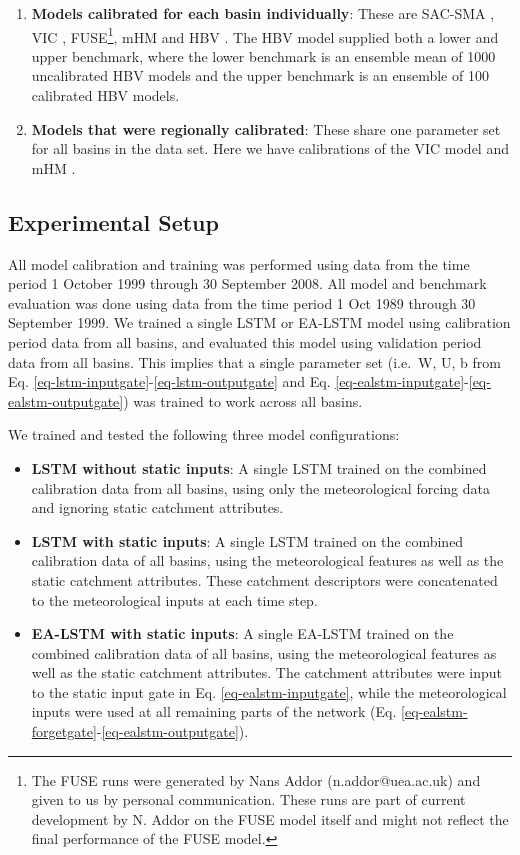 \begin{enumerate}
  \item \textbf{Models calibrated for each basin individually}: These are SAC-SMA \citep{newman2017benchmarking}, VIC \citep{newman2017benchmarking}, FUSE\footnote{The FUSE runs were generated by Nans Addor (n.addor@uea.ac.uk) and given to us by personal communication. These runs are part of current development by N. Addor on the FUSE model itself and might not reflect the final performance of the FUSE model.}, mHM \citep{mizukami2019choice} and HBV \citep{seibert2018upper}. The HBV model supplied both a lower and upper benchmark, where the lower benchmark is an ensemble mean of 1000 uncalibrated HBV models and the upper benchmark is an ensemble of 100 calibrated HBV models.
  \item \textbf{Models that were regionally calibrated}: These share one parameter set for all basins in the data set. Here we have calibrations of the VIC model \citep{mizukami2017towards} and mHM \citep{rakovec2019diagnostic}.
\end{enumerate}

\subsection{Experimental Setup} All model calibration and training was performed using data from the time period 1 October 1999 through 30 September 2008. All model and benchmark evaluation was done using data from the time period 1 Oct 1989 through 30 September 1999. We trained a single \gls{LSTM} or \gls{EA-LSTM} model using calibration period data from all basins, and evaluated this model using validation period data from all basins. This implies that a single parameter set (i.e.\ W, U, b from Eq. \ref{eq-lstm-inputgate}-\ref{eq-lstm-outputgate} and Eq. \ref{eq-ealstm-inputgate}-\ref{eq-ealstm-outputgate}) was trained to work across all basins.

We trained and tested the following three model configurations:

\begin{itemize}
  \item \textbf{LSTM without static inputs}: A single \gls{LSTM} trained on the combined calibration data from all basins, using only the meteorological forcing data and ignoring static catchment attributes. 
  \item \textbf{LSTM with static inputs}: A single \gls{LSTM} trained on the combined calibration data of all basins, using the meteorological features as well as the static catchment attributes. These catchment descriptors were concatenated to the meteorological inputs at each time step.
  \item \textbf{EA-LSTM with static inputs}: A single \gls{EA-LSTM} trained on the combined calibration data of all basins, using the meteorological features as well as the static catchment attributes. The catchment attributes were input to the static input gate in Eq. \ref{eq-ealstm-inputgate}, while the meteorological inputs were used at all remaining parts of the network (Eq. \ref{eq-ealstm-forgetgate}-\ref{eq-ealstm-outputgate}).
\end{itemize}

